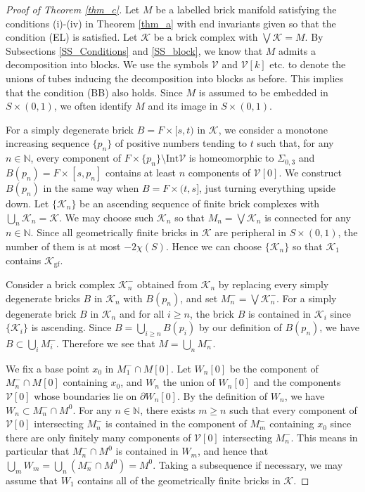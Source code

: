 \documentclass{amsart}
\theoremstyle{definition}
\numberwithin{figure}{section}
\numberwithin{equation}{section}
\newcommand{\blackboard}[1]{\ensuremath{\mathbb{#1}}}
\newcommand{\naturals}{\blackboard{N}}
\def\nn{\naturals}
\def\ck{\mathcal{K}}
\def\cv{\mathcal{V}}
\def\part{\partial}
\def\Int{\mathrm{Int}}
\def\Sg{\Sigma}
\def\Sg{\Sigma}
\begin{document}
\begin{proof}[Proof of Theorem \ref{thm_c}]
Let  $M$ be a labelled brick manifold satisfying the conditions (i)-(iv) in Theorem \ref{thm_a} with end invariants given so that the condition (EL) is satisfied.
Let $\ck$ be a brick complex with $\bigvee \ck=M$.
By Subsections \ref{SS_Conditions} and \ref{SS_block}, 
we know that $M$ admits a decomposition into blocks.
We use the symbols $\cv$ and $\cv[k]$ etc. to denote the unions of tubes inducing the decomposition into blocks as before.
This implies that  the condition (BB) also holds.
Since $M$ is assumed to be embedded in $S \times (0,1)$, we often identify $M$ and its image in $S\times (0,1)$.

For a simply degenerate brick $B=F\times [s,t)$ in $\ck$, we consider a monotone increasing sequence $\{p_n\}$ of 
positive numbers tending to $t$ such that, for any $n\in \nn$, every component of $F\times \{p_n\}\setminus \Int \cv$ 
is homeomorphic to $\Sg_{0,3}$ and $B(p_n)=F\times [s,p_n]$ contains at least $n$ components of $\cv[0]$.
We construct $B(p_n)$ in the same way when $B=F \times (t,s]$, just turning everything upside down.
Let $\{\ck_n\}$ be an ascending sequence of finite brick complexes with $\bigcup_n\ck_n=\ck$.
We may choose such $\ck_n$ so that $M_n=\bigvee \ck_n$ is connected for any $n\in \nn$.
Since all geometrically finite bricks in $\ck$ are peripheral in $S\times (0,1)$, the number of them 
is at most $-2\chi(S)$.
Hence we can choose $\{\ck_n\}$ so that $\ck_1$ contains $\ck_{\mathrm{gf}}$.


Consider a brick complex $\ck_n^-$ obtained from $\ck_n$ by replacing every simply degenerate bricks
 $B$ in 
$\ck_n$ with $B(p_n)$, and set $M_n^-=\bigvee \ck_n^-$.
For a simply degenerate brick $B$ in $\ck_n$ and for all $i \geq n$, the brick $B$ is contained in $\ck_i$ since $\{\ck_i\}$ is ascending.
Since $B=\bigcup_{i\geq n}B(p_i)$ by our definition of $B(p_n)$, we have $B \subset \bigcup_i M_i^-$.
Therefore we see that $M=\bigcup_n M_n^-$.

We fix a base point $x_0$ in $M_1^- \cap M[0]$.
Let $W_n[0]$ be the component of $M_n^-\cap M[0]$ containing  $x_0$, 
and  $W_n$ the union of $W_n[0]$  and 
the components  $\cv[0]$ whose boundaries lie on $\part W_n[0]$.
By the definition of $W_n$, we have $W_n\subset M_n^-\cap M^0$.
For any $n\in \nn$, there exists $m\geq n$ such that every component of $\cv[0]$ intersecting $M_n^-$ is contained in the component of $M_m^-$ containing $x_0$ since there are only finitely many components of $\cv[0]$ intersecting $M_n^-$.
This means in particular that $M_n^-\cap M^0$ is contained in $W_m$, and hence that $\bigcup_m W_m=\bigcup_n (M_n^-\cap 
M^0)=M^0$.
Taking a subsequence if necessary, we may assume that $W_1$ contains all of the geometrically finite bricks in $\ck$.



\end{proof}
\end{document}
